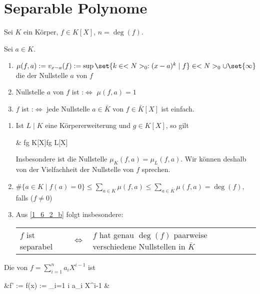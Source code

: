 \section{Separable Polynome}
Sei $K$ ein Körper, $f \in K[X]$, $n = \deg(f)$.
\begin{definition}
	Sei $a \in K$.
	\begin{enumerate}[label={(\arabic*)}]
		\item $\mu(f,a) := v_{x-a}(f) := \sup \set{k \in \N_0 : (x-a)^k \mid f} \in \N_0 \cup \set{\infty}$ die  der Nullstelle $a$ von $f$
		\item Nullstelle $a$ von $f$ ist  :$\Leftrightarrow$ $\mu(f,a) = 1$
		\item $f$ ist  :$\Leftrightarrow$ jede Nullstelle $a\in\bar K$ von $f\in\bar K[X]$ ist einfach.
	\end{enumerate}
\end{definition}
\begin{remark}
	\begin{enumerate}[label={(\alph*)}]
		\item Ist $L\mid K$ eine Körpererweiterung und $g\in K[X]$, so gilt \begin{flalign*}
			\qquad & f\mid g\;\; K[X]\quad\Leftrightarrow\quad f\mid g\;\text{in}\; L[X]
		\end{flalign*}
		Insbesondere ist die Nullstelle $\mu_K(f,a) = \mu_L(f,a)$. Wir können deshalb von der Vielfachheit der Nullstelle von $f$ sprechen.
		\item {} $\displaystyle\#\{a\in K\mid f(a) = 0\} \le \sum_{a\in K} \mu(f,a) \le \sum_{a\in \bar K} \mu(f,a) = \deg(f)$, falls ($f\neq 0$)
		\item Aus \ref{1_6_2_b} folgt insbesondere:\\
		\begin{tabularx}{\linewidth}{XcX}
			\hfill$f$ ist separabel & $\Leftrightarrow$ & $f$ hat genau $\deg(f)$ paarweise verschiedene Nullstellen in $\bar K$
		\end{tabularx}
	\end{enumerate}
\end{remark}
\begin{definition}
	Die  von $f = \sum_{i=1}^n a_i X^{i-1}$ ist \begin{flalign*}
		\qquad &f' :=  f(x) := \sum_{i=1} i a_i X^{i-1} &
	\end{flalign*}
\end{definition}
